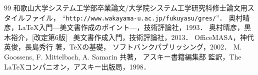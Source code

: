 \documentclass[11pt]{jreport}
\begin{document}

\begin{thebibliography}{99}
    和歌山大学システム工学部卒業論文/大学院システム工学研究科修士論文用スタイルファイル，
    ``{\tt http://www.wakayama-u.ac.jp/fukuyasu/gres/}''．
    奥村晴彦，\LaTeX 入門---美文書作成のポイント---，技術評論社，1993．
    奥村晴彦，黒木裕介，[改定第6版] \LaTeXe~美文書作成入門，技術評論社，2013．
    OfficeMASA，神代英俊，長島秀行 著，\TeX の基礎，
    ソフトバンクパブリッシング，2002．
    M. Goossens, F. Mittelbach, A. Samarin 共著，
    アスキー書籍編集部 監訳，The \LaTeX コンパニオン，アスキー出版局，1998．
\end{thebibliography}


% 
% 
% 

\end{document}
